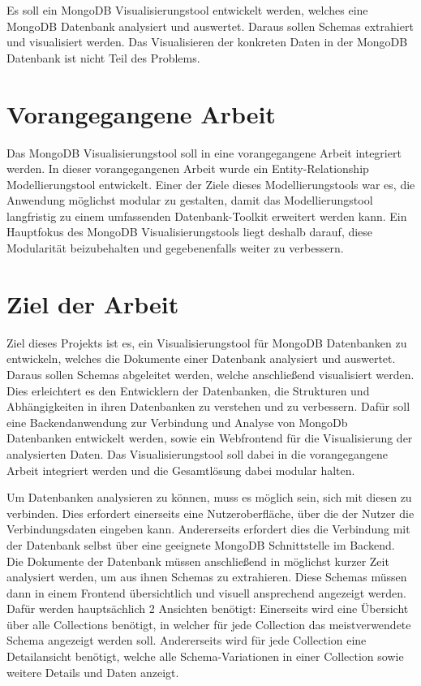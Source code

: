 Es soll ein MongoDB Visualisierungstool entwickelt werden, welches eine MongoDB Datenbank analysiert und auswertet.
Daraus sollen Schemas extrahiert und visualisiert werden.
Das Visualisieren der konkreten Daten in der MongoDB Datenbank ist nicht Teil des Problems.

\section{Vorangegangene Arbeit}
\label{sec:vorangegangene_arbeit}

Das MongoDB Visualisierungstool soll in eine vorangegangene Arbeit integriert werden.
In dieser vorangegangenen Arbeit wurde ein Entity-Relationship Modellierungstool entwickelt.
Einer der Ziele dieses Modellierungstools war es, die Anwendung möglichst modular zu gestalten, damit das Modellierungstool langfristig zu einem umfassenden Datenbank-Toolkit erweitert werden kann.
Ein Hauptfokus des MongoDB Visualisierungstools liegt deshalb darauf, diese Modularität beizubehalten und gegebenenfalls weiter zu verbessern.

\section{Ziel der Arbeit}
\label{sec:ziel}

Ziel dieses Projekts ist es, ein Visualisierungstool für MongoDB Datenbanken zu entwickeln, welches die Dokumente einer Datenbank analysiert und auswertet.
Daraus sollen Schemas abgeleitet werden, welche anschließend visualisiert werden.
Dies erleichtert es den Entwicklern der Datenbanken, die Strukturen und Abhängigkeiten in ihren Datenbanken zu verstehen und zu verbessern.
Dafür soll eine Backendanwendung zur Verbindung und Analyse von MongoDb Datenbanken entwickelt werden, sowie ein Webfrontend für die Visualisierung der analysierten Daten.
Das Visualisierungstool soll dabei in die vorangegangene Arbeit integriert werden und die Gesamtlösung dabei modular halten.

Um Datenbanken analysieren zu können, muss es möglich sein, sich mit diesen zu verbinden.
Dies erfordert einerseits eine Nutzeroberfläche, über die der Nutzer die Verbindungsdaten eingeben kann.
Andererseits erfordert dies die Verbindung mit der Datenbank selbst über eine geeignete MongoDB Schnittstelle im Backend.
Die Dokumente der Datenbank müssen anschließend in möglichst kurzer Zeit analysiert werden, um aus ihnen Schemas zu extrahieren.
Diese Schemas müssen dann in einem Frontend übersichtlich und visuell ansprechend angezeigt werden.
Dafür werden hauptsächlich 2 Ansichten benötigt:
Einerseits wird eine Übersicht über alle Collections benötigt, in welcher  für jede Collection das meistverwendete Schema angezeigt werden soll.
Andererseits wird für jede Collection eine Detailansicht benötigt, welche alle Schema-Variationen in einer Collection sowie  weitere Details und Daten anzeigt.


